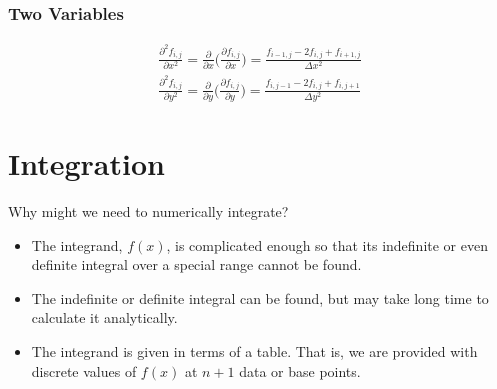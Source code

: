 \documentclass[12pt]{article}
\begin{document}
\subsubsection{Two Variables}
\begin{center}
\end{center}

\begin{align}
\frac{\partial^2 f_{i,j}}{\partial x^2} = \frac{\partial}{\partial x}\bigl(\frac{\partial f_{i,j}}{\partial x}\bigr) =
\frac{f_{i-1,j} - 2f_{i,j} + f_{i+1,j}}{\Delta x^2} \\
%
\frac{\partial^2 f_{i,j}}{\partial y^2} = \frac{\partial}{\partial y}\bigl(\frac{\partial f_{i,j}}{\partial y}\bigr) =
\frac{f_{i,j-1} - 2f_{i,j} + f_{i,j+1}}{\Delta y^2}
\end{align}



\section{Integration}
Why might we need to numerically integrate?
\begin{itemize}
\item The integrand, $f(x)$, is complicated enough so that its
indefinite or even definite integral over a special range cannot
be found.
\item The indefinite or definite integral can be found, but may take
long time to calculate it analytically.
\item The integrand is given in terms of a table. That is, we are
provided with discrete values of $f(x)$ at $n+1$ data or base
points.
\end{itemize}
\end{document}
